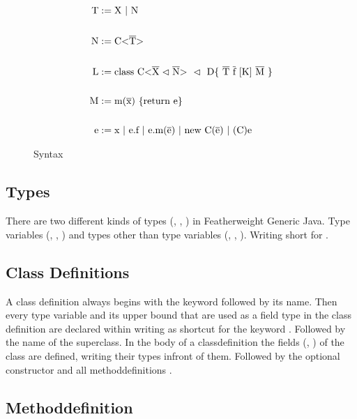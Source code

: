 \begin{figure}
    \begin{align*}
        \text{T} &:= \text{X} \ | \ \text{N}\\
        \\
        \text{N} &:= \text{C} \vv{\ot{T}}\\
        \\
        \text{L} &:= \text{class} \ \text{C} \xn \ \vartriangleleft \ \text{D} \{ \ \ot{T} \ \ot{f} \ [\text{K}] \ \ot{M} \ \}\\
        \\
        \text{M} &:= \text{m}(\ot{x}) \ \{\text{return e}\}\\
        \\
        \text{e} &:= \text{x} \ | \ \text{e.f} \ | \ \text{e.m(}\ot{e}\text{)} \ | \ \text{new C(}\ot{e}\text{)} \ | \ \text{(C)e}
    \end{align*}
    \caption{Syntax}
    \label{syntax}
\end{figure}

\subsection{Types}

There are two different kinds of types (, , ) in Featherweight Generic Java.
Type variables (, , ) and types other than type variables (, , ).
Writing  short for .

\subsection{Class Definitions}

A class definition  always begins with the keyword  followed by its name. Then every type variable and its upper bound that are used as a field type in the class definition are declared within \inl{<>} writing \inl{\vartriangleleft} as shortcut for the keyword .
Followed by the name of the superclass. In the body of a classdefinition the fields (, ) of the class are defined, writing their types infront of them. Followed by the optional constructor  and all methoddefinitions .

\subsection{Methoddefinition}

